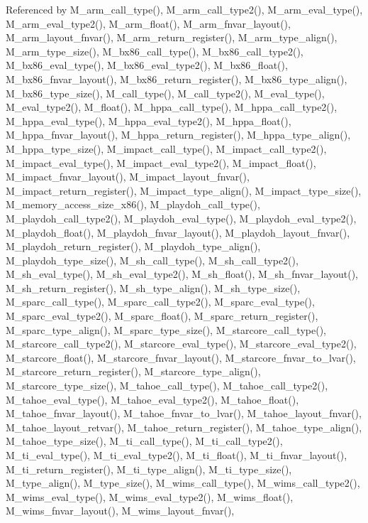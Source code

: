 Referenced by M\_\-arm\_\-call\_\-type(), M\_\-arm\_\-call\_\-type2(), M\_\-arm\_\-eval\_\-type(), M\_\-arm\_\-eval\_\-type2(), M\_\-arm\_\-float(), M\_\-arm\_\-fnvar\_\-layout(), M\_\-arm\_\-layout\_\-fnvar(), M\_\-arm\_\-return\_\-register(), M\_\-arm\_\-type\_\-align(), M\_\-arm\_\-type\_\-size(), M\_\-bx86\_\-call\_\-type(), M\_\-bx86\_\-call\_\-type2(), M\_\-bx86\_\-eval\_\-type(), M\_\-bx86\_\-eval\_\-type2(), M\_\-bx86\_\-float(), M\_\-bx86\_\-fnvar\_\-layout(), M\_\-bx86\_\-return\_\-register(), M\_\-bx86\_\-type\_\-align(), M\_\-bx86\_\-type\_\-size(), M\_\-call\_\-type(), M\_\-call\_\-type2(), M\_\-eval\_\-type(), M\_\-eval\_\-type2(), M\_\-float(), M\_\-hppa\_\-call\_\-type(), M\_\-hppa\_\-call\_\-type2(), M\_\-hppa\_\-eval\_\-type(), M\_\-hppa\_\-eval\_\-type2(), M\_\-hppa\_\-float(), M\_\-hppa\_\-fnvar\_\-layout(), M\_\-hppa\_\-return\_\-register(), M\_\-hppa\_\-type\_\-align(), M\_\-hppa\_\-type\_\-size(), M\_\-impact\_\-call\_\-type(), M\_\-impact\_\-call\_\-type2(), M\_\-impact\_\-eval\_\-type(), M\_\-impact\_\-eval\_\-type2(), M\_\-impact\_\-float(), M\_\-impact\_\-fnvar\_\-layout(), M\_\-impact\_\-layout\_\-fnvar(), M\_\-impact\_\-return\_\-register(), M\_\-impact\_\-type\_\-align(), M\_\-impact\_\-type\_\-size(), M\_\-memory\_\-access\_\-size\_\-x86(), M\_\-playdoh\_\-call\_\-type(), M\_\-playdoh\_\-call\_\-type2(), M\_\-playdoh\_\-eval\_\-type(), M\_\-playdoh\_\-eval\_\-type2(), M\_\-playdoh\_\-float(), M\_\-playdoh\_\-fnvar\_\-layout(), M\_\-playdoh\_\-layout\_\-fnvar(), M\_\-playdoh\_\-return\_\-register(), M\_\-playdoh\_\-type\_\-align(), M\_\-playdoh\_\-type\_\-size(), M\_\-sh\_\-call\_\-type(), M\_\-sh\_\-call\_\-type2(), M\_\-sh\_\-eval\_\-type(), M\_\-sh\_\-eval\_\-type2(), M\_\-sh\_\-float(), M\_\-sh\_\-fnvar\_\-layout(), M\_\-sh\_\-return\_\-register(), M\_\-sh\_\-type\_\-align(), M\_\-sh\_\-type\_\-size(), M\_\-sparc\_\-call\_\-type(), M\_\-sparc\_\-call\_\-type2(), M\_\-sparc\_\-eval\_\-type(), M\_\-sparc\_\-eval\_\-type2(), M\_\-sparc\_\-float(), M\_\-sparc\_\-return\_\-register(), M\_\-sparc\_\-type\_\-align(), M\_\-sparc\_\-type\_\-size(), M\_\-starcore\_\-call\_\-type(), M\_\-starcore\_\-call\_\-type2(), M\_\-starcore\_\-eval\_\-type(), M\_\-starcore\_\-eval\_\-type2(), M\_\-starcore\_\-float(), M\_\-starcore\_\-fnvar\_\-layout(), M\_\-starcore\_\-fnvar\_\-to\_\-lvar(), M\_\-starcore\_\-return\_\-register(), M\_\-starcore\_\-type\_\-align(), M\_\-starcore\_\-type\_\-size(), M\_\-tahoe\_\-call\_\-type(), M\_\-tahoe\_\-call\_\-type2(), M\_\-tahoe\_\-eval\_\-type(), M\_\-tahoe\_\-eval\_\-type2(), M\_\-tahoe\_\-float(), M\_\-tahoe\_\-fnvar\_\-layout(), M\_\-tahoe\_\-fnvar\_\-to\_\-lvar(), M\_\-tahoe\_\-layout\_\-fnvar(), M\_\-tahoe\_\-layout\_\-retvar(), M\_\-tahoe\_\-return\_\-register(), M\_\-tahoe\_\-type\_\-align(), M\_\-tahoe\_\-type\_\-size(), M\_\-ti\_\-call\_\-type(), M\_\-ti\_\-call\_\-type2(), M\_\-ti\_\-eval\_\-type(), M\_\-ti\_\-eval\_\-type2(), M\_\-ti\_\-float(), M\_\-ti\_\-fnvar\_\-layout(), M\_\-ti\_\-return\_\-register(), M\_\-ti\_\-type\_\-align(), M\_\-ti\_\-type\_\-size(), M\_\-type\_\-align(), M\_\-type\_\-size(), M\_\-wims\_\-call\_\-type(), M\_\-wims\_\-call\_\-type2(), M\_\-wims\_\-eval\_\-type(), M\_\-wims\_\-eval\_\-type2(), M\_\-wims\_\-float(), M\_\-wims\_\-fnvar\_\-layout(), M\_\-wims\_\-layout\_\-fnvar(), 